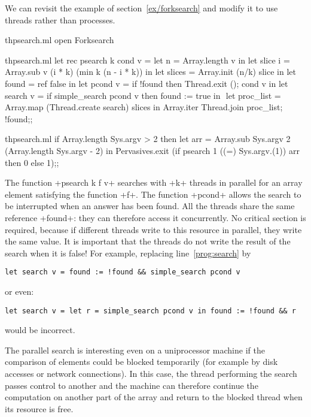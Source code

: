 \begin{example}
We can revisit the example of section~\ref{ex/forksearch} and modify it to use
threads rather than processes.
\begin{codefile}{thpsearch.ml}
open Forksearch
\end{codefile}
%
\begin{listingcodefile}[style=numbers]{thpsearch.ml}
let rec psearch k cond v =
  let n = Array.length v in
  let slice i = Array.sub v (i * k) (min k (n - i * k)) in 
  let slices = Array.init (n/k) slice in 
  let found = ref false in
  let pcond v = if !found then Thread.exit (); cond v in
  let search v = if simple_search pcond v then found := true in $\label{prog:search}$
  let proc_list = Array.map (Thread.create search) slices in
  Array.iter Thread.join proc_list; 
  !found;;
\end{listingcodefile}
%
\begin{codefile}{thpsearch.ml}
if Array.length Sys.argv > 2 then
let arr = Array.sub Sys.argv 2 (Array.length Sys.argv - 2) in
Pervasives.exit (if psearch 1 ((=) Sys.argv.(1)) arr then  0 else 1);;
\end{codefile}
%
The function \ml+psearch k f v+ searches with \ml+k+ threads in
parallel for an array element satisfying the function \ml+f+.
The function \ml+pcond+ allows the search to be interrupted when an
answer has been found.  All the threads share the same reference
\ml+found+: they can therefore access it concurrently.  No critical
section is required, because if different threads write to this resource
in parallel, they write the same value.  It is important that the
threads do not write the result of the search when it is false!
For example, replacing line~\ref{prog:search} by
%
\begin{lstlisting}
let search v = found := !found && simple_search pcond v
\end{lstlisting}
%
or even:
%
\begin{lstlisting}
let search v = let r = simple_search pcond v in found := !found && r 
\end{lstlisting}
%
would be incorrect.
\enlargethispage{1\onelineskip} %
\end{example}
\pagebreak

The parallel search is interesting even on a uniprocessor machine if
the comparison of elements could be blocked temporarily (for example by
disk accesses or network connections).  In this case, the thread
performing the search passes control to another and the machine can
therefore continue the computation on another part of the array and
return to the blocked thread when its resource is free.

